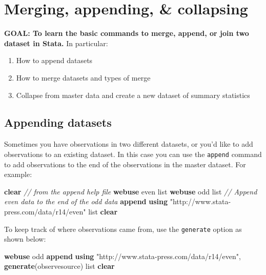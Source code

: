\documentclass[
]{book}
\newenvironment{Shaded}{\begin{snugshade}}{\end{snugshade}}
\newcommand{\CommentTok}[1]{\textcolor[rgb]{0.56,0.35,0.01}{\textit{#1}}}
\newcommand{\KeywordTok}[1]{\textcolor[rgb]{0.13,0.29,0.53}{\textbf{#1}}}
\newcommand{\NormalTok}[1]{#1}
\newcommand{\OtherTok}[1]{\textcolor[rgb]{0.56,0.35,0.01}{#1}}
\newcommand{\StringTok}[1]{\textcolor[rgb]{0.31,0.60,0.02}{#1}}
\providecommand{\tightlist}{%
  \setlength{\itemsep}{0pt}\setlength{\parskip}{0pt}}
\begin{document}
\hypertarget{merging-appending-collapsing}{%
\section{Merging, appending, \& collapsing}\label{merging-appending-collapsing}}

\begin{alert}

\textbf{GOAL: To learn the basic commands to merge, append, or join two dataset in Stata.} In particular:

\begin{enumerate}
\def\labelenumi{\arabic{enumi}.}
\tightlist
\item
  How to append datasets
\item
  How to merge datasets and types of merge
\item
  Collapse from master data and create a new dataset of summary statistics
\end{enumerate}

\end{alert}

\hypertarget{appending-datasets}{%
\subsection{Appending datasets}\label{appending-datasets}}

Sometimes you have observations in two different datasets, or you'd like to add observations to an existing dataset. In this case you can use the \texttt{append} command to add observations to the end of the observations in the master dataset. For example:

\begin{Shaded}
\begin{Highlighting}[]
\KeywordTok{clear}
\CommentTok{// from the append help file}
\KeywordTok{webuse}\NormalTok{ even}
\OtherTok{list}
\KeywordTok{webuse}\NormalTok{ odd}
\OtherTok{list}
\CommentTok{// Append even data to the end of the odd data}
\KeywordTok{append} \KeywordTok{using} \StringTok{"http://www.stata{-}press.com/data/r14/even"}
\OtherTok{list}
\KeywordTok{clear}
\end{Highlighting}
\end{Shaded}

To keep track of where observations came from, use the \texttt{generate} option as shown below:

\begin{Shaded}
\begin{Highlighting}[]
\KeywordTok{webuse}\NormalTok{ odd}
\KeywordTok{append} \KeywordTok{using} \StringTok{"http://www.stata{-}press.com/data/r14/even"}\NormalTok{, }\KeywordTok{generate}\NormalTok{(observesource)}
\OtherTok{list}
\KeywordTok{clear}
\end{Highlighting}
\end{Shaded}
\end{document}
